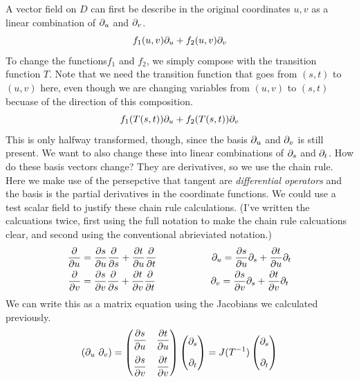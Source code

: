 \documentclass[fleqn,letterpaper]{report}
\begin{document}
A vector field on $D$ can first be describe in the original
coordinates $u,v$ as a linear combination of $\partial_u$ and
$\partial_v$.
\begin{equation*}
f_1(u,v) \partial_u + f_2(u,v) \partial_v 
\end{equation*}
To change the functions$f_1$ and $f_2$, we simply compose with the
transition function $T$. Note that we need the transition function
that goes from $(s,t)$ to $(u,v)$ here, even though we are
changing variables from $(u,v)$ to $(s,t)$ becuase of the
direction of this composition.
\begin{equation*}
f_1(T(s,t)) \partial_u + f_2(T(s,t)) \partial_v 
\end{equation*}
This is only halfway transformed, though, since the basis
$\partial_u$ and $\partial_v$ is still present. We want to also change
these into linear combinations of $\partial_s$ and $\partial_t$. How
do these basis vectors change? They are derivatives, so we use
the chain rule. Here we make use of the persepctive that
tangent are \emph{differential operators} and the basis is the
partial derivatives in the coordinate functions. We could use
a test scalar field to justify these chain rule calculations.
(I've written the calcuations twice, first using the full
notation to make the chain rule calcuations clear, and second
using the conventional abrieviated notation.)
\begin{align*}
\frac{\partial}{\partial u} & = 
\frac{\partial s}{\partial u} \frac{\partial}{\partial s} + 
\frac{\partial t}{\partial u} \frac{\partial}{\partial t} \hspace{2cm} 
\partial_u = \frac{\partial s}{\partial u} \partial_s + 
\frac{\partial t}{\partial u} \partial_t \\ 
\frac{\partial}{\partial v} & = 
\frac{\partial s}{\partial v} \frac{\partial}{\partial s} + 
\frac{\partial t}{\partial v} \frac{\partial}{\partial t} \hspace{2cm} 
\partial_v = \frac{\partial s}{\partial v} \partial_s + 
\frac{\partial t}{\partial v} \partial_t 
\end{align*}
We can write this as a matrix equation using the Jacobians we
calculated previously. 
\begin{equation*}
\left( \partial_u \ \partial_v \right) =
\left( \begin{matrix} 
\dfrac{\partial s}{\partial u} & 
\dfrac{\partial t}{\partial u} \\[1em]
\dfrac{\partial s}{\partial v} & 
\dfrac{\partial t}{\partial v} 
\end{matrix} \right) 
\left( \begin{matrix} \partial_s \\[1em] 
\partial_t \end{matrix} \right) = J(T^{-1}) 
\left( \begin{matrix} \partial_s \\[1em] 
\partial_t \end{matrix} \right) 
\end{equation*}
\end{document}
